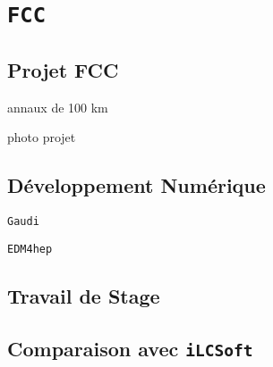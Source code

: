 \chapter{\texttt{FCC}}

\section{Projet FCC}

annaux de 100 km

photo projet

\section{Développement Numérique}

\texttt{Gaudi}

\texttt{EDM4hep}

\section{Travail de Stage}

\section{Comparaison avec \texttt{iLCSoft}}
